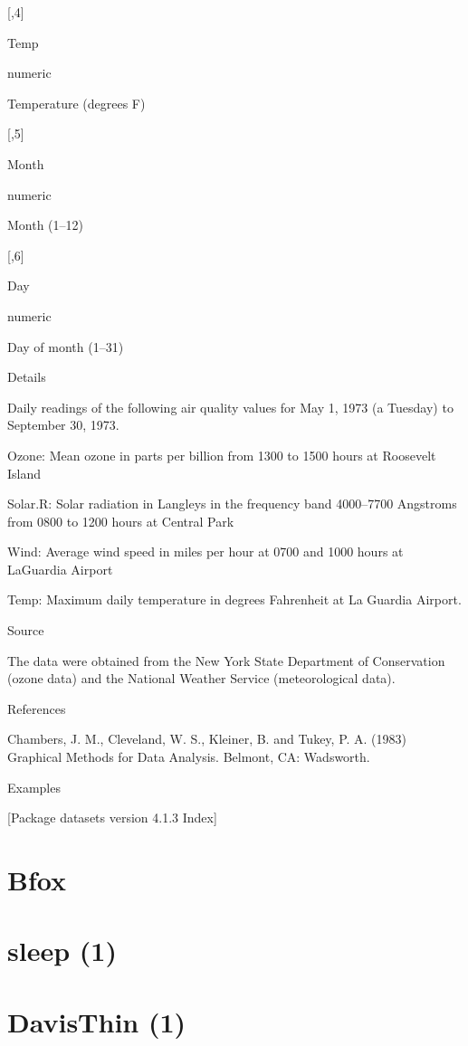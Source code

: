 \documentclass[
]{book}
\begin{document}
{[},4{]}

Temp

numeric

Temperature (degrees F)

{[},5{]}

Month

numeric

Month (1--12)

{[},6{]}

Day

numeric

Day of month (1--31)

Details

Daily readings of the following air quality values for May 1, 1973 (a
Tuesday) to September 30, 1973.

Ozone: Mean ozone in parts per
billion from 1300 to 1500 hours at Roosevelt Island

Solar.R: Solar radiation
in Langleys in the frequency band 4000--7700 Angstroms from
0800 to 1200 hours at Central Park

Wind: Average wind speed in miles
per hour at 0700 and 1000 hours at LaGuardia Airport

Temp: Maximum daily
temperature in degrees Fahrenheit at La Guardia Airport.

Source

The data were obtained from the New York State Department of
Conservation (ozone data) and the National Weather Service
(meteorological data).

References

Chambers, J. M., Cleveland, W. S., Kleiner, B. and Tukey, P. A. (1983)
Graphical Methods for Data Analysis.
Belmont, CA: Wadsworth.

Examples

{[}Package datasets version 4.1.3 Index{]}

\hypertarget{bfox}{%
\section{Bfox}\label{bfox}}

\hypertarget{sleep-1}{%
\section{sleep (1)}\label{sleep-1}}

\hypertarget{davisthin-1}{%
\section{DavisThin (1)}\label{davisthin-1}}
\end{document}
